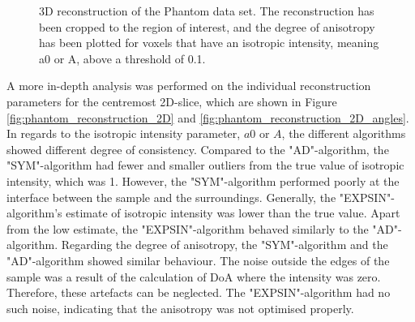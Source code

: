 \begin{figure}[h!]
    
    \caption[3D Reconstructions of Phantom Data Set]{ 3D reconstruction of the Phantom data set.
        The reconstruction has been cropped to the region of interest,
        and the degree of anisotropy has been plotted for voxels that have an isotropic intensity, meaning a0 or A, above a threshold of 0.1. }
    \label{fig:phantom_reconstruction_3D}
\end{figure}

\clearpage
A more in-depth analysis was performed on
the individual reconstruction parameters for the centremost 2D-slice, which are shown in Figure \ref{fig:phantom_reconstruction_2D} and \ref{fig:phantom_reconstruction_2D_angles}. %
In regards to the isotropic intensity parameter, $a0$ or $A$, the different algorithms showed different degree of consistency.
Compared to the "AD"-algorithm, the "SYM"-algorithm had fewer and smaller outliers from the true value of isotropic intensity, which was 1.
However, the "SYM"-algorithm performed poorly at the interface between the sample and the surroundings.
Generally, the "EXPSIN"-algorithm's estimate of isotropic intensity was lower than the true value.
Apart from the low estimate, the "EXPSIN"-algorithm behaved similarly to the "AD"-algorithm.
Regarding the degree of anisotropy, the "SYM"-algorithm and the "AD"-algorithm showed similar behaviour.
The noise outside the edges of the sample was a result of the calculation of DoA where the intensity was zero.
Therefore, these artefacts can be neglected.
The "EXPSIN"-algorithm had no such noise, indicating that the anisotropy was not optimised properly.



